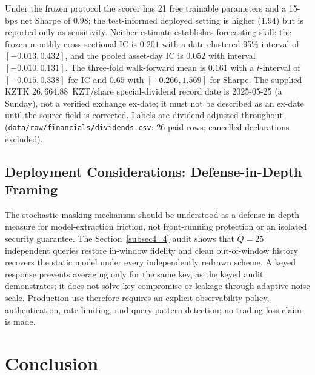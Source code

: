 \documentclass[pdflatex,sn-mathphys-num]{sn-jnl}
\theoremstyle{thmstyleone}
\theoremstyle{thmstyletwo}
\theoremstyle{thmstylethree}
\begin{document}
Under the frozen protocol the scorer has 21 free trainable parameters and a 15-bps net Sharpe of $0.98$; the test-informed deployed setting is higher ($1.94$) but is reported only as sensitivity. Neither estimate establishes forecasting skill: the frozen monthly cross-sectional IC is $0.201$ with a date-clustered 95\% interval of $[-0.013,0.432]$, and the pooled asset-day IC is $0.052$ with interval $[-0.010,0.131]$. The three-fold walk-forward mean is $0.161$ with a $t$-interval of $[-0.015,0.338]$ for IC and $0.65$ with $[-0.266,1.569]$ for Sharpe. The supplied KZTK $26{,}664.88$~KZT/share special-dividend record date is 2025-05-25 (a Sunday), not a verified exchange ex-date; it must not be described as an ex-date until the source field is corrected. Labels are dividend-adjusted throughout (\texttt{data/raw/financials/dividends.csv}: 26 paid rows; cancelled declarations excluded).

\subsection{Deployment Considerations: Defense-in-Depth Framing}\label{subsec5_2}

The stochastic masking mechanism should be understood as a defense-in-depth measure for model-extraction friction, not front-running protection or an isolated security guarantee. The Section~\ref{subsec4_4} audit shows that $Q = 25$ independent queries restore in-window fidelity and clean out-of-window history recovers the static model under every independently redrawn scheme. A keyed response prevents averaging only for the same key, as the keyed audit demonstrates; it does not solve key compromise or leakage through adaptive noise scale. Production use therefore requires an explicit observability policy, authentication, rate-limiting, and query-pattern detection; no trading-loss claim is made.

\section{Conclusion}\label{sec6}
\end{document}
